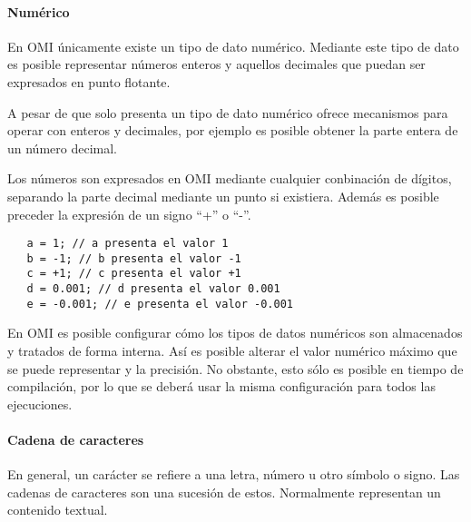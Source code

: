 \paragraph{Numérico}\label{sec:type_num}
En OMI únicamente existe un tipo de dato numérico. Mediante este tipo de dato es posible representar 
números enteros y aquellos decimales que puedan ser expresados en punto flotante. 

A pesar de que solo presenta un tipo de dato numérico ofrece mecanismos para operar con enteros y decimales, por ejemplo es posible obtener la parte entera de 
un número decimal.

Los números son expresados en OMI mediante cualquier conbinación de dígitos, separando la parte decimal mediante un punto si existiera. Además es
posible preceder la expresión de un signo ``+'' o ``-''. \\

\begin{lstlisting}
   a = 1; // a presenta el valor 1
   b = -1; // b presenta el valor -1
   c = +1; // c presenta el valor +1
   d = 0.001; // d presenta el valor 0.001
   e = -0.001; // e presenta el valor -0.001
\end{lstlisting}

En OMI es posible configurar cómo los tipos de datos numéricos son almacenados y tratados de forma interna. Así es posible alterar el valor numérico máximo que se puede representar 
y la precisión. No obstante, esto sólo es posible en tiempo de compilación, por lo que se deberá usar la misma configuración para todos las ejecuciones. \\


\paragraph{Cadena de caracteres}\label{sec:type_string}
En general, un carácter se refiere a una letra, número u otro símbolo o signo. Las cadenas de caracteres son una sucesión de estos. Normalmente representan un contenido textual. 

